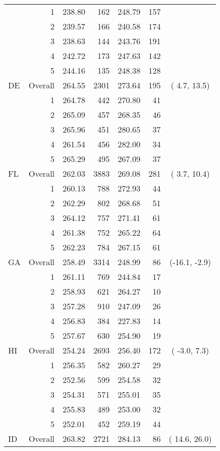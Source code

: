 \begin{longtable}{lrrr@{\extracolsep{.25cm}}rrc}
   & 1 & 238.80 & 162 & 248.79 & 157 &  \\ 
   & 2 & 239.57 & 166 & 240.58 & 174 &  \\ 
   & 3 & 238.63 & 144 & 243.76 & 191 &  \\ 
   & 4 & 242.72 & 173 & 247.63 & 142 &  \\ 
   & 5 & 244.16 & 135 & 248.38 & 128 &  \\ 
   \hline
DE & Overall & 264.55 & 2301 & 273.64 & 195 & (  4.7,  13.5) \\ 
   & 1 & 264.78 & 442 & 270.80 &  41 &  \\ 
   & 2 & 265.09 & 457 & 268.35 &  46 &  \\ 
   & 3 & 265.96 & 451 & 280.65 &  37 &  \\ 
   & 4 & 261.54 & 456 & 282.00 &  34 &  \\ 
   & 5 & 265.29 & 495 & 267.09 &  37 &  \\ 
   \hline
FL & Overall & 262.03 & 3883 & 269.08 & 281 & (  3.7,  10.4) \\ 
   & 1 & 260.13 & 788 & 272.93 &  44 &  \\ 
   & 2 & 262.29 & 802 & 268.68 &  51 &  \\ 
   & 3 & 264.12 & 757 & 271.41 &  61 &  \\ 
   & 4 & 261.38 & 752 & 265.22 &  64 &  \\ 
   & 5 & 262.23 & 784 & 267.15 &  61 &  \\ 
   \hline
GA & Overall & 258.49 & 3314 & 248.99 &  86 & (-16.1,  -2.9) \\ 
   & 1 & 261.11 & 769 & 244.84 &  17 &  \\ 
   & 2 & 258.93 & 621 & 264.27 &  10 &  \\ 
   & 3 & 257.28 & 910 & 247.09 &  26 &  \\ 
   & 4 & 256.83 & 384 & 227.83 &  14 &  \\ 
   & 5 & 257.67 & 630 & 254.90 &  19 &  \\ 
   \hline
HI & Overall & 254.24 & 2693 & 256.40 & 172 & ( -3.0,   7.3) \\ 
   & 1 & 256.35 & 582 & 260.27 &  29 &  \\ 
   & 2 & 252.56 & 599 & 254.58 &  32 &  \\ 
   & 3 & 254.31 & 571 & 255.01 &  35 &  \\ 
   & 4 & 255.83 & 489 & 253.00 &  32 &  \\ 
   & 5 & 252.01 & 452 & 259.19 &  44 &  \\ 
   \hline
ID & Overall & 263.82 & 2721 & 284.13 &  86 & ( 14.6,  26.0) \\ 

\end{longtable}
